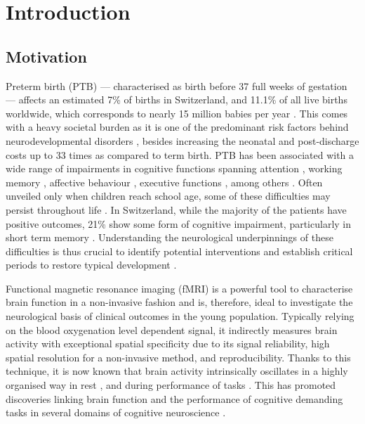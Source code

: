 \cleardoublepage

\chapter{Introduction}

\vspace{-1cm}

\section{Motivation}

Preterm birth  (PTB) --- characterised as birth before 37 full weeks of gestation --- affects an estimated 7\% of births in Switzerland, and 11.1\% of all live births worldwide, which corresponds to nearly 15 million babies per year \citep{Blencowe2013}. 
This comes with a heavy societal burden as it is one of the predominant risk factors behind neurodevelopmental disorders \citep{Pierrat2017,Twilhaar2018}, besides increasing the neonatal and post-discharge costs up to 33 times \citep{Tommiska2003} as compared to term birth. %
PTB has been associated with a wide range of impairments in cognitive functions spanning attention \citep{Rommel2017}, working memory \citep{Allotey2018}, affective behaviour \citep{Hornman2016}, executive functions \citep{Costa2017, Burnett2018}, among others \citep{Moreira2014, Allotey2018}. 
Often unveiled only when children reach school age, some of these difficulties may persist throughout life \citep{Anderson2014, Kajantie2019}. In Switzerland, while the majority of the patients have positive outcomes, 21\% show some form of cognitive impairment, particularly in short term memory \citep{Pittet-Metrailler2019a}.  Understanding the neurological underpinnings of these difficulties is thus crucial to identify potential interventions and establish critical periods to restore typical development \citep{Wolke2019}.

 Functional magnetic resonance imaging (fMRI) is a powerful tool to characterise brain function in a non-invasive fashion and is, therefore, ideal to investigate the neurological basis of clinical outcomes in the young population. Typically relying on the blood oxygenation level dependent signal, it indirectly measures brain activity with exceptional spatial specificity due to its signal reliability, high spatial resolution for a non-invasive method, and reproducibility. Thanks to this technique, it is now known that brain activity intrinsically oscillates in a highly organised way in rest \citep{Damoiseaux2006}, and during performance of tasks \citep{Elliott2019}. This has promoted discoveries linking brain function and the performance of cognitive demanding tasks in several domains of cognitive neuroscience \citep{Raichle2001, Poldrack2012, DEsposito2016}. 
 
